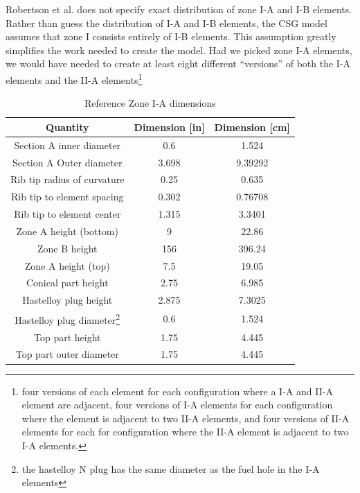 Robertson et al. does not specify exact distribution of zone I-A and I-B
elements. Rather than guess the distribution of I-A and I-B elements, the CSG
model assumes that zone I consists entirely of I-B elements. This assumption
greatly simplifies the work needed to create the model. Had we picked zone I-A
elements, we would have needed to create at least eight different ``versions''
of both the I-A elements and the II-A elements\footnote{four versions of each
element for each configuration where a I-A and II-A element are adjacent,
four versions of I-A elements for each configuration where the element is
adjacent to two II-A elements, and four versions of II-A elements for each for
configuration where the II-A element is adjacent to two I-A elements.}

\begin{table}[htpb]
    \centering
    \caption{Reference Zone I-A dimensions}
    \label{tab:zone-ia-ref-specs}
    \begin{tabulary}{\linewidth}{|C|C|C|}
    \hline
    Quantity & Dimension [in] & Dimension [\unit{\centi\metre}]\\
    \hline
    Section A inner diameter & 0.6 & 1.524 \\
    \hline
    Section A Outer diameter & 3.698 & 9.39292 \\
    \hline
    Rib tip radius of curvature & 0.25 & 0.635 \\
    \hline
    Rib tip to element spacing & 0.302 & 0.76708 \\
    \hline
    Rib tip to element center & 1.315 & 3.3401 \\
    \hline
    Zone A height (bottom) & 9 & 22.86\\
    \hline
    Zone B height & 156 & 396.24 \\
    \hline
    Zone A height (top) & 7.5 & 19.05 \\
    \hline
    Conical part height & 2.75 & 6.985 \\
    \hline
    Hastelloy plug height & 2.875 & 7.3025 \\
    \hline
    Hastelloy plug diameter\footnote{the hastelloy N plug has the same diameter as the fuel hole in the I-A elements} & 0.6 & 1.524 \\
    \hline
    Top part height & 1.75 & 4.445 \\
    \hline
    Top part outer diameter & 1.75 & 4.445 \\
    \hline
    \end{tabulary}
\end{table}


